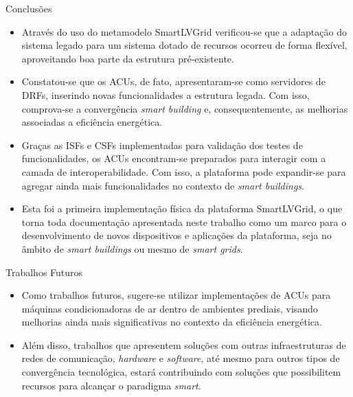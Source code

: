 \begin{frame}{Conclusões}
\small{
\begin{itemize}
\item Através do uso do metamodelo SmartLVGrid verificou-se que a adaptação do sistema legado para um sistema dotado de recursos ocorreu de forma flexível, aproveitando boa parte da estrutura pré-existente.
\item  Constatou-se que os ACUs, de fato, apresentaram-se como servidores de DRFs, inserindo novas funcionalidades a estrutura legada. Com isso, comprova-se a convergência \textit{smart building} e, consequentemente, as melhorias associadas a eficiência energética.
\item Graças as ISFs e CSFs implementadas para validação dos testes de funcionalidades, os ACUs encontram-se preparados para interagir com a camada de interoperabilidade. Com isso, a plataforma pode expandir-se para agregar ainda mais funcionalidades no contexto de \textit{smart buildings}.
\item  Esta foi a primeira implementação física da plataforma SmartLVGrid, o que torna toda documentação apresentada neste trabalho como um marco para o desenvolvimento de novos dispositivos e aplicações da plataforma, seja no âmbito de \textit{smart buildings} ou mesmo de \textit{smart grids}.
\end{itemize}
}
\end{frame}

\begin{frame}{Trabalhos Futuros}

\begin{itemize}
\item Como trabalhos futuros, sugere-se utilizar implementações de ACUs para máquinas condicionadoras de ar dentro de ambientes prediais, visando melhorias ainda mais significativas no contexto da eficiência energética.
\end{itemize}

\begin{itemize}
\item Além disso, trabalhos que apresentem soluções com outras infraestruturas de redes de comunicação, \textit{hardware} e \textit{software}, até mesmo para outros tipos de convergência tecnológica, estará contribuindo com soluções que possibilitem recursos para alcançar o paradigma \textit{smart}.
\end{itemize}
\end{frame}
